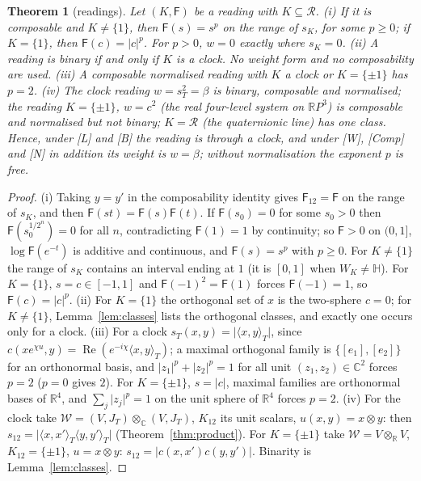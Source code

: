 \documentclass[aps,pra,onecolumn,superscriptaddress,nofootinbib,10pt]{revtex4-2}
\newtheorem{theorem}{Theorem}
\theoremstyle{definition}
\theoremstyle{remark}
\newcommand{\R}{\mathbb{R}}
\newcommand{\C}{\mathbb{C}}
\newcommand{\HH}{\mathbb{H}}
\newcommand{\cR}{\mathcal{R}}
\newcommand{\re}{\operatorname{Re}}
\newcommand{\ip}[2]{\langle #1,#2\rangle}
\begin{document}
\begin{theorem}[readings]\label{thm:readings}
Let $(K,\mathsf F)$ be a reading with $K\subseteq\cR$.
(i) If it is composable and $K\ne\{1\}$, then $\mathsf F(s)=s^p$ on the range of $s_K$, for some $p\ge0$; if
$K=\{1\}$, then $\mathsf F(c)=\lvert c\rvert^p$.  For $p>0$, $w=0$ exactly where $s_K=0$.
(ii) A reading is binary if and only if $K$ is a clock.  No weight form and no composability are used.
(iii) A composable normalised reading with $K$ a clock or $K=\{\pm1\}$ has $p=2$.
(iv) The clock reading $w=s_T^2=\beta$ is binary, composable and normalised; the reading $K=\{\pm1\}$,
$w=c^2$ (the real four-level system on $\R P^3$) is composable and normalised but not binary; $K=\cR$
(the quaternionic line) has one class.
Hence, under [L] and [B] the reading is through a clock, and under [W], [Comp] and [N] in addition its
weight is $w=\beta$; without normalisation the exponent $p$ is free.
\end{theorem}
\begin{proof}
(i) Taking $y=y'$ in the composability identity gives $\mathsf F_{12}=\mathsf F$ on the range of $s_K$, and then
$\mathsf F(st)=\mathsf F(s)\mathsf F(t)$.  If $\mathsf F(s_0)=0$ for some $s_0>0$ then $\mathsf F(s_0^{1/2^n})=0$ for all $n$, contradicting
$\mathsf F(1)=1$ by continuity; so $\mathsf F>0$ on $(0,1]$, $\log \mathsf F(e^{-t})$ is additive and continuous, and $\mathsf F(s)=s^p$ with
$p\ge0$.  For $K\ne\{1\}$ the range of $s_K$ contains an interval ending at $1$ (it is $[0,1]$ when
$W_K\ne\HH$).  For $K=\{1\}$, $s=c\in[-1,1]$ and
$\mathsf F(-1)^2=\mathsf F(1)$ forces $\mathsf F(-1)=1$, so $\mathsf F(c)=\lvert c\rvert^p$.
(ii) For $K=\{1\}$ the orthogonal set of $x$ is the two-sphere $c=0$; for $K\ne\{1\}$, Lemma~\ref{lem:classes} lists the
orthogonal classes, and exactly one occurs only for a clock.
(iii) For a clock $s_T(x,y)=\lvert\ip{x}{y}_T\rvert$, since $c(xe^{\chi u},y)=\re(e^{-i\chi}\ip{x}{y}_T)$; a maximal
orthogonal family is $\{[e_1],[e_2]\}$ for an orthonormal basis, and $\lvert z_1\rvert^p+\lvert z_2\rvert^p=1$ for all
unit $(z_1,z_2)\in\C^2$ forces $p=2$ ($p=0$ gives $2$).  For $K=\{\pm1\}$, $s=\lvert c\rvert$, maximal families are orthonormal bases of
$\R^4$, and $\sum_j\lvert z_j\rvert^p=1$ on the unit sphere of $\R^4$ forces $p=2$.
(iv) For the clock take $\mathcal W=(V,J_T)\otimes_\C(V,J_T)$, $K_{12}$ its unit scalars, $u(x,y)=x\otimes y$: then
$s_{12}=\lvert\ip{x}{x'}_T\ip{y}{y'}_T\rvert$ (Theorem~\ref{thm:product}).  For $K=\{\pm1\}$ take $\mathcal W=V\otimes_\R V$,
$K_{12}=\{\pm1\}$, $u=x\otimes y$: $s_{12}=\lvert c(x,x')c(y,y')\rvert$.  Binarity is Lemma~\ref{lem:classes}.
\end{proof}
\end{document}
